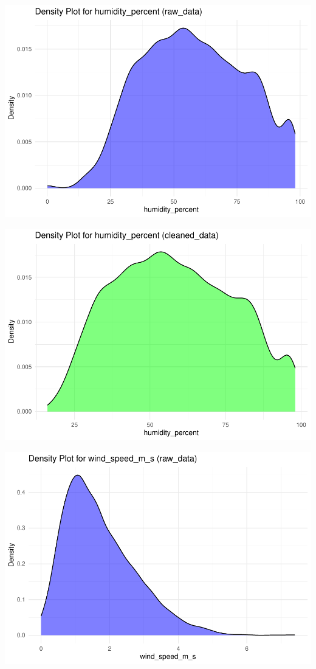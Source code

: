 \documentclass[
  11pt,
  letterpaper,
]{article}
\begin{document}
\begin{center}\includegraphics[width=1.2\linewidth,]{Final_Project_files/figure-latex/unnamed-chunk-15-5} \end{center}

\begin{center}\includegraphics[width=1.2\linewidth,]{Final_Project_files/figure-latex/unnamed-chunk-15-6} \end{center}

\begin{center}\includegraphics[width=1.2\linewidth,]{Final_Project_files/figure-latex/unnamed-chunk-15-7} \end{center}
\end{document}
